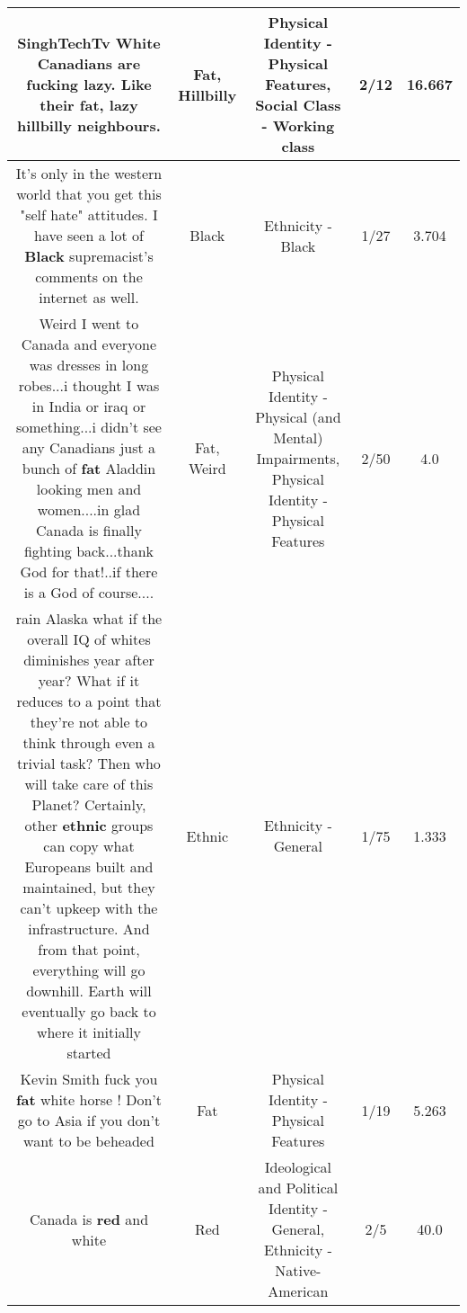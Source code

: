 \documentclass[11pt]{article}
\newlength\mylength
\begin{document}
\begin{center}
\begin{longtable}{|C{.65\mylength}|C{.30\mylength}|C{.12\mylength}|C{.12\mylength}|C{.12\mylength}|}
  \small SinghTechTv White Canadians are fucking lazy. Like their \textbf{fat}, lazy \textbf{hillbilly} neighbours.\normalsize   & Fat, Hillbilly & Physical Identity - Physical Features, Social Class - Working class & 2/12 & 16.667 \\  \hline
  \small It's only in the western world that you get this "self hate" attitudes. I have seen a lot of \textbf{Black}  supremacist's comments on the internet as well.\normalsize   & Black & Ethnicity - Black & 1/27 & 3.704 \\  \hline
  \small Weird I went to Canada and everyone was dresses in long robes...i thought I was in India or iraq or something...i didn't see any Canadians just a bunch of \textbf{fat} Aladdin looking men and women....in glad Canada is finally fighting back...thank God for that!..if there is a God of course....\normalsize   & Fat, Weird & Physical Identity - Physical (and Mental) Impairments, Physical Identity - Physical Features & 2/50 & 4.0 \\  \hline
  \small rain Alaska what if the overall IQ of whites diminishes year after year? What if it reduces to a point that they're not able to think through even a trivial task? Then who will take care of this Planet? Certainly, other \textbf{ethnic} groups can copy what Europeans built and maintained, but they can't upkeep with the infrastructure. And from that point,  everything will go downhill. Earth will eventually go back to where it initially started\normalsize   & Ethnic & Ethnicity - General & 1/75 & 1.333 \\  \hline
  \small Kevin Smith fuck you \textbf{fat} white horse ! Don't go to Asia if you don't want to be beheaded\normalsize   & Fat & Physical Identity - Physical Features & 1/19 & 5.263 \\  \hline
  \small Canada is \textbf{r\textbf{ed}} and white\normalsize   & Red &  Ideological and Political Identity - General, Ethnicity - Native-American & 2/5 & 40.0 \\  \hline

\end{longtable}
\end{center}
\end{document}
